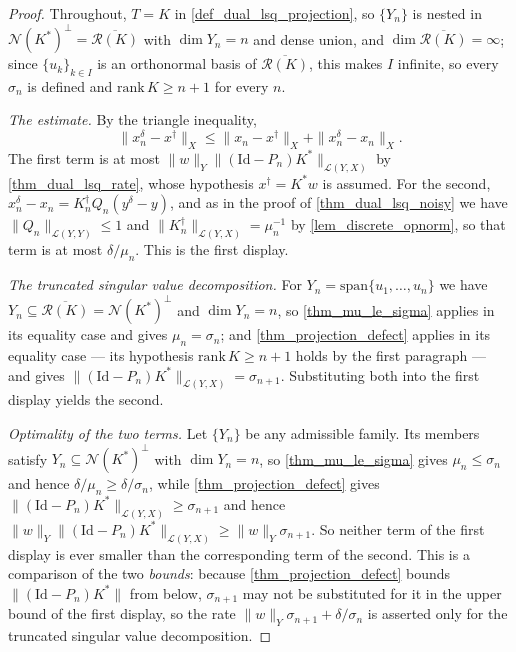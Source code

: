 \documentclass[a4paper]{report}
\theoremstyle{plain}
\theoremstyle{definition}
\theoremstyle{remark}
\newcommand{\Ll}{\mathcal{L}}
\newcommand{\Ran}{\mathcal{R}}
\newcommand{\Ker}{\mathcal{N}}
\newcommand{\Id}{\mathrm{Id}}
\newcommand{\dg}{^{\dagger}}
\begin{document}
\begin{proof}
  Throughout, $T = K$ in \cref{def_dual_lsq_projection}, so $\{Y_n\}$ is nested in
  $\Ker(K^{*})^{\perp} = \overline{\Ran(K)}$ with $\dim Y_n = n$ and dense union, and
  $\dim\overline{\Ran(K)} = \infty$; since $\{u_k\}_{k \in I}$ is an orthonormal basis of
  $\overline{\Ran(K)}$, this makes $I$ infinite, so every $\sigma_n$ is defined and
  $\mathrm{rank}\,K \ge n+1$ for every $n$.

  \emph{The estimate.}  By the triangle inequality,
  \[
    \|x^{\delta}_n - x\dg\|_X \le \|x_n - x\dg\|_X + \|x^{\delta}_n - x_n\|_X .
  \]
  The first term is at most $\|w\|_Y\|(\Id-P_n)K^{*}\|_{\Ll(Y,X)}$ by
  \cref{thm_dual_lsq_rate}, whose hypothesis $x\dg = K^{*}w$ is assumed.  For the second,
  $x^{\delta}_n - x_n = K_n\dg Q_n(y^{\delta} - y)$, and as in the proof of
  \cref{thm_dual_lsq_noisy} we have $\|Q_n\|_{\Ll(Y,Y)} \le 1$ and
  $\|K_n\dg\|_{\Ll(Y,X)} = \mu_n^{-1}$ by \cref{lem_discrete_opnorm}, so that term is at
  most $\delta/\mu_n$.  This is the first display.

  \emph{The truncated singular value decomposition.}  For
  $Y_n = \mathrm{span}\{u_1,\dots,u_n\}$ we have $Y_n \subseteq \overline{\Ran(K)} =
  \Ker(K^{*})^{\perp}$ and $\dim Y_n = n$, so \cref{thm_mu_le_sigma} applies in its
  equality case and gives $\mu_n = \sigma_n$; and \cref{thm_projection_defect} applies in
  its equality case --- its hypothesis $\mathrm{rank}\,K \ge n+1$ holds by the first
  paragraph --- and gives $\|(\Id - P_n)K^{*}\|_{\Ll(Y,X)} = \sigma_{n+1}$.  Substituting
  both into the first display yields the second.

  \emph{Optimality of the two terms.}  Let $\{Y_n\}$ be any admissible family.  Its
  members satisfy $Y_n \subseteq \Ker(K^{*})^{\perp}$ with $\dim Y_n = n$, so
  \cref{thm_mu_le_sigma} gives $\mu_n \le \sigma_n$ and hence
  $\delta/\mu_n \ge \delta/\sigma_n$, while \cref{thm_projection_defect} gives
  $\|(\Id-P_n)K^{*}\|_{\Ll(Y,X)} \ge \sigma_{n+1}$ and hence
  $\|w\|_Y\|(\Id-P_n)K^{*}\|_{\Ll(Y,X)} \ge \|w\|_Y\sigma_{n+1}$.  So neither term of the
  first display is ever smaller than the corresponding term of the second.  This is a
  comparison of the two \emph{bounds}: because \cref{thm_projection_defect} bounds
  $\|(\Id-P_n)K^{*}\|$ from below, $\sigma_{n+1}$ may not be substituted for it in the
  upper bound of the first display, so the rate $\|w\|_Y\sigma_{n+1} + \delta/\sigma_n$ is
  asserted only for the truncated singular value decomposition.
\end{proof}
\end{document}
